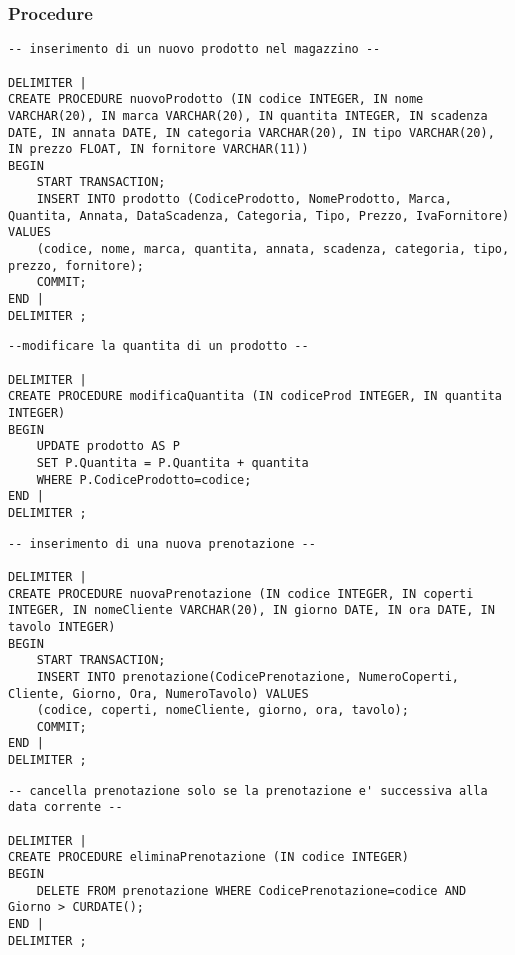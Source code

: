 \subsubsection{Procedure}
\begin{lstlisting}[title=Operazione 1, style=mysqlStyle]
-- inserimento di un nuovo prodotto nel magazzino --

DELIMITER |
CREATE PROCEDURE nuovoProdotto (IN codice INTEGER, IN nome VARCHAR(20), IN marca VARCHAR(20), IN quantita INTEGER, IN scadenza DATE, IN annata DATE, IN categoria VARCHAR(20), IN tipo VARCHAR(20), IN prezzo FLOAT, IN fornitore VARCHAR(11))
BEGIN
    START TRANSACTION;
    INSERT INTO prodotto (CodiceProdotto, NomeProdotto, Marca, Quantita, Annata, DataScadenza, Categoria, Tipo, Prezzo, IvaFornitore) VALUES
    (codice, nome, marca, quantita, annata, scadenza, categoria, tipo, prezzo, fornitore);
    COMMIT;
END |
DELIMITER ;
\end{lstlisting}

\begin{lstlisting}[title=Operazione 2, style=mysqlStyle]
--modificare la quantita di un prodotto --

DELIMITER |
CREATE PROCEDURE modificaQuantita (IN codiceProd INTEGER, IN quantita INTEGER)
BEGIN
    UPDATE prodotto AS P
    SET P.Quantita = P.Quantita + quantita
    WHERE P.CodiceProdotto=codice; 
END |
DELIMITER ;
\end{lstlisting}

\begin{lstlisting}[title=Operazione 3, style=mysqlStyle]
-- inserimento di una nuova prenotazione --

DELIMITER |
CREATE PROCEDURE nuovaPrenotazione (IN codice INTEGER, IN coperti INTEGER, IN nomeCliente VARCHAR(20), IN giorno DATE, IN ora DATE, IN tavolo INTEGER)
BEGIN
    START TRANSACTION;
    INSERT INTO prenotazione(CodicePrenotazione, NumeroCoperti, Cliente, Giorno, Ora, NumeroTavolo) VALUES
    (codice, coperti, nomeCliente, giorno, ora, tavolo);
    COMMIT;
END |
DELIMITER ;
\end{lstlisting}

\begin{lstlisting}[title=Operazione 4, style=mysqlStyle]
-- cancella prenotazione solo se la prenotazione e' successiva alla data corrente --

DELIMITER |
CREATE PROCEDURE eliminaPrenotazione (IN codice INTEGER)
BEGIN
    DELETE FROM prenotazione WHERE CodicePrenotazione=codice AND Giorno > CURDATE();
END |
DELIMITER ;
\end{lstlisting}

